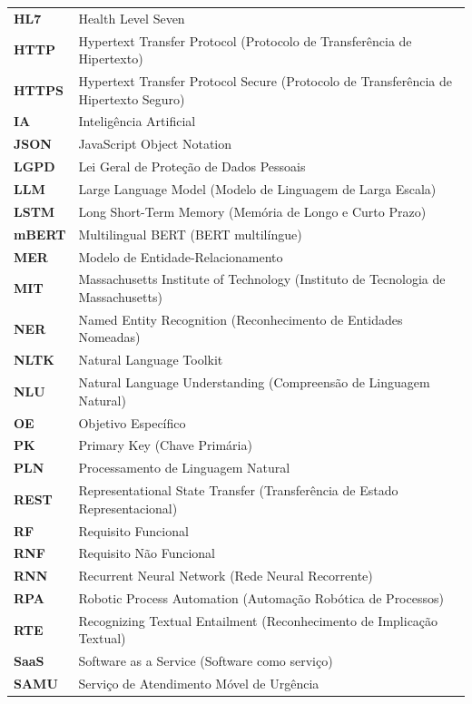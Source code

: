 \documentclass[12pt,a4paper]{extarticle}
\begin{document}
\begin{xltabular}{\textwidth}{@{}p{1.6cm}Y@{}}
\textbf{HL7} & Health Level Seven \\
\textbf{HTTP} & Hypertext Transfer Protocol (Protocolo de Transferência de Hipertexto) \\
\textbf{HTTPS} & Hypertext Transfer Protocol Secure (Protocolo de Transferência de Hipertexto Seguro) \\
\textbf{IA} & Inteligência Artificial \\
\textbf{JSON} & JavaScript Object Notation \\
\textbf{LGPD} & Lei Geral de Proteção de Dados Pessoais \\
\textbf{LLM} & Large Language Model (Modelo de Linguagem de Larga Escala) \\
\textbf{LSTM} & Long Short-Term Memory (Memória de Longo e Curto Prazo) \\
\textbf{mBERT} & Multilingual BERT (BERT multilíngue) \\
\textbf{MER} & Modelo de Entidade-Relacionamento \\
\textbf{MIT} & Massachusetts Institute of Technology (Instituto de Tecnologia de Massachusetts) \\
\textbf{NER} & Named Entity Recognition (Reconhecimento de Entidades Nomeadas) \\
\textbf{NLTK} & Natural Language Toolkit \\
\textbf{NLU} & Natural Language Understanding (Compreensão de Linguagem Natural) \\
\textbf{OE} & Objetivo Específico \\
\textbf{PK} & Primary Key (Chave Primária) \\
\textbf{PLN} & Processamento de Linguagem Natural \\
\textbf{REST} & Representational State Transfer (Transferência de Estado Representacional) \\
\textbf{RF} & Requisito Funcional \\
\textbf{RNF} & Requisito Não Funcional \\
\textbf{RNN} & Recurrent Neural Network (Rede Neural Recorrente) \\
\textbf{RPA} & Robotic Process Automation (Automação Robótica de Processos) \\
\textbf{RTE} & Recognizing Textual Entailment (Reconhecimento de Implicação Textual) \\
\textbf{SaaS} & Software as a Service (Software como serviço) \\
\textbf{SAMU} & Serviço de Atendimento Móvel de Urgência \\

\end{xltabular}
\end{document}
